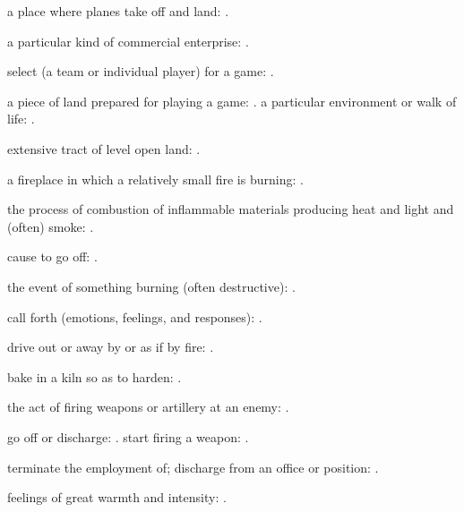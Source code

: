   a place where planes take off and land:   .

  a particular kind of commercial enterprise:   .

  select (a team or individual player) for a game: .

  a piece of land prepared for playing a game:   . a particular environment or walk of life:   .

  extensive tract of level open land:   .

  a fireplace in which a relatively small fire is burning: .

  the process of combustion of inflammable materials producing heat and light and (often) smoke:   .

  cause to go off:   .

  the event of something burning (often destructive): .

  call forth (emotions, feelings, and responses):   .

  drive out or away by or as if by fire: .

  bake in a kiln so as to harden: .

  the act of firing weapons or artillery at an enemy:   .

  go off or discharge:   . start firing a weapon:   .

  terminate the employment of; discharge from an office or position:   .

  feelings of great warmth and intensity:   .

